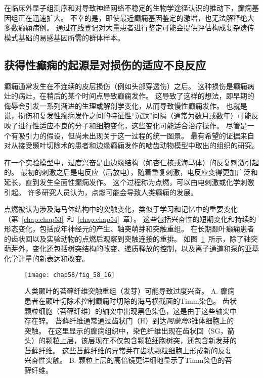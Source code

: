 在临床外显子组测序和对导致神经网络不稳定的生物学途径认识的推动下，癫痫基因组正在迅速扩大。
不幸的是，即使最近癫痫基因鉴定的激增，也无法解释绝大多数癫痫病例。
通过在线登记对大量患者进行鉴定可能会提供评估构成复杂遗传模式基础的易感基因所需的群体样本。



\subsection{获得性癫痫的起源是对损伤的适应不良反应}

癫痫通常发生在不连续的皮层损伤（例如头部穿透伤）之后。
这种损伤是癫痫病灶的病灶，在稍后的某个时间点导致癫痫发作。
这导致了这样的想法，即早期的侮辱会引发一系列渐进的生理或解剖学变化，从而导致慢性癫痫发作。
也就是说，损伤和复发性癫痫发作之间的特征性“沉默”间隔（通常为数月或数年）可能反映了进行性适应不良的分子和细胞变化，这些变化可能适合治疗操作。
尽管是一个有吸引力的假设，但尚未出现关于这一过程的统一图景。
最有希望的证据来自对从接受颞叶切除术的患者和边缘癫痫发作的啮齿动物模型中取出的组织的研究。


在一个实验模型中，过度兴奋是由边缘结构（如杏仁核或海马体）的反复刺激引起的。
最初的刺激之后是电反应（后放电），随着重复刺激，电反应变得更加广泛和延长，直到发生全面性癫痫发作。
这个过程称为点燃，可以由电刺激或化学刺激引起。
许多研究人员认为，点燃可能会导致人类癫痫的发展。


点燃被认为涉及海马体结构中的突触变化，类似于学习和记忆中的重要变化（第~\ref{chap:chap53}~和~\ref{chap:chap54}~章）。
这些包括兴奋性的短期变化和持续的形态变化，包括成年神经元的产生、轴突萌芽和突触重组。
在长期颞叶癫痫患者的齿状回以及实验动物的点燃后观察到突触连接的重排。
如图~\ref{fig:58_16}~所示，除了轴突萌芽外，变化还包括树突结构的改变、递质释放的控制，以及离子通道和泵的亚基化学计量的新表达和改变。


\begin{figure}[htbp]
	\centering
	\texttt{[image: chap58/fig\_58\_16]}
	\caption{人类颞叶的苔藓纤维突触重组（发芽）可能导致过度兴奋\cite{sutula1989mossy}。
		A. 癫痫患者在颞叶切除术控制癫痫时切除的海马横截面的Timm染色。
		齿状颗粒细胞（苔藓纤维）的轴突中出现黑色染色，这是由于这些轴突中存在锌。
		苔藓纤维通常通过齿状门（H）到达\textit{阿蒙角}3锥体细胞上的突触。
		在这里显示的癫痫组织中，染色纤维出现在齿状回（SG，箭头）的颗粒上层，该层现在不仅包含颗粒细胞树突，还包含新发芽的苔藓纤维。
		这些苔藓纤维的异常芽在齿状颗粒细胞上形成新的反复兴奋性突触。
		B. 颗粒上层的高倍镜更详细地显示了Timm染色的苔藓纤维。}
	\label{fig:58_16}
\end{figure}


